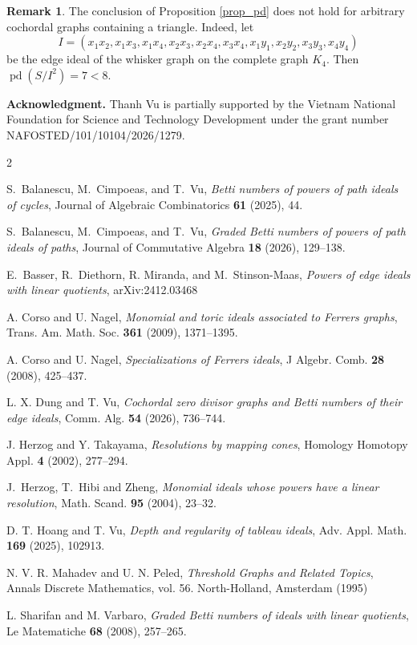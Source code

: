 \documentclass[12pt,amscd]{amsart}
\theoremstyle{definition}
\newtheorem{rem}[thm]{Remark}
\numberwithin{equation}{section}
\DeclareMathOperator{\pd}{pd}
\begin{document}
\begin{rem}\label{rem_counterexample} 
The conclusion of Proposition \ref{prop_pd} does not hold for arbitrary cochordal graphs containing a triangle. Indeed, let 
$$I = (x_1x_2, x_1x_3, x_1x_4, x_2x_3, x_2x_4, x_3x_4, x_1y_1, x_2y_2, x_3y_3, x_4y_4)$$
be the edge ideal of the whisker graph on the complete graph $K_4$. Then $\pd(S/I^2) = 7 < 8$.
\end{rem}

\noindent\textbf{Acknowledgment.} Thanh Vu is partially supported by the Vietnam National Foundation for Science and Technology Development under the grant number NAFOSTED/101/10104/2026/1279.

\begin{thebibliography}{2}

 S.~Balanescu, M.~Cimpoeas, and T.~Vu, {\it Betti numbers of powers of path ideals of cycles}, Journal of Algebraic Combinatorics {\bf 61} (2025), 44.
 
 S.~Balanescu, M.~Cimpoeas, and T.~Vu, {\it Graded Betti numbers of powers of path ideals of paths}, Journal of Commutative Algebra {\bf 18} (2026), 129--138.
 

 E.~Basser, R.~Diethorn, R. Miranda, and M.~Stinson-Maas, {\it Powers of edge ideals with linear quotients}, arXiv:2412.03468
  
 
 A. Corso and U. Nagel,  {\it Monomial and toric ideals associated to Ferrers graphs}, Trans. Am. Math. Soc. {\bf 361} (2009),   1371--1395.

 
 
 A. Corso and U. Nagel,  {\it Specializations of Ferrers ideals}, J Algebr. Comb. {\bf 28} (2008), 425--437.

 L. X. Dung and T.  Vu, {\it  Cochordal zero divisor graphs and Betti numbers of their edge ideals}, Comm. Alg. {\bf 54} (2026), 736--744.

 J. Herzog  and Y. Takayama, {\it Resolutions by mapping cones}, Homology Homotopy Appl. {\bf 4} (2002), 277--294.


  
 J.~Herzog, T.~Hibi and  Zheng, \emph{Monomial ideals whose powers have a linear resolution}, Math. Scand. {\bf 95} (2004), 23--32.

 D. T.  Hoang and T.  Vu, {\it  Depth and regularity of tableau ideals}, Adv. Appl. Math. {\bf 169} (2025), 102913. 


 N. V. R. Mahadev and U. N. Peled, {\it Threshold Graphs and Related Topics}, Annals Discrete Mathematics, vol. 56. North-Holland, Amsterdam (1995)

 L. Sharifan and M. Varbaro, {\it Graded Betti numbers of ideals with linear quotients}, Le Matematiche {\bf 68} (2008), 257--265.


\end{thebibliography}
\end{document}
